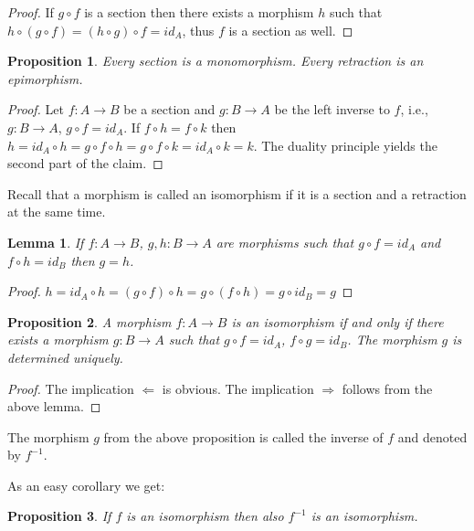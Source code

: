 \documentclass[12pt]{article}
\newcommand{\Map}[3]{#1:#2\to#3}
\newcommand{\inv}[1]{#1^{-1}}
\newtheorem{PROP}{Proposition}
\newtheorem{LM}{Lemma}
\begin{document}
\begin{proof}
If $g\circ f$ is a section then there exists a morphism $h$ such that $h\circ(g\circ
f)=(h\circ g)\circ f=id_A$, thus $f$ is a section as well.
\end{proof}

\begin{PROP} %
Every section is a monomorphism. Every retraction is an epimorphism.
\end{PROP}

\begin{proof}
Let $\Map fAB$ be a section and $\Map gBA$ be the left inverse to $f$, i.e., $\Map gBA$,
$g\circ f=id_A$. If $f\circ h=f\circ k$ then $h=id_A\circ h=g\circ f\circ h=g\circ f\circ
k=id_A\circ k=k$. The duality principle yields the second part of the claim.
\end{proof}

Recall that a morphism is called an isomorphism if it is a section and a retraction at the same time.

\begin{LM}
If $\Map fAB$, $\Map{g,h}BA$ are morphisms such that $g\circ f=id_A$ and $f\circ h=id_B$ then
$g=h$.
\end{LM}

\begin{proof}
$h=id_A\circ h=(g\circ f)\circ h=g\circ(f\circ h)=g\circ id_B=g$
\end{proof}

\begin{PROP}
A morphism $\Map fAB$ is an isomorphism if and only if there exists a morphism $\Map gBA$
such that $g\circ f=id_A$, $f\circ g=id_B$. The morphism $g$ is determined uniquely.
\end{PROP}

\begin{proof}
The implication $\boxed{\Leftarrow}$ is obvious. The implication $\boxed{\Rightarrow}$
follows from the above lemma.
\end{proof}

The morphism $g$ from the above proposition is called the inverse of $f$ and denoted by $f^{-1}$.

As an easy corollary we get:

\begin{PROP} %
If $f$ is an isomorphism then also $\inv f$ is an isomorphism.
\end{PROP}

\end{document}
